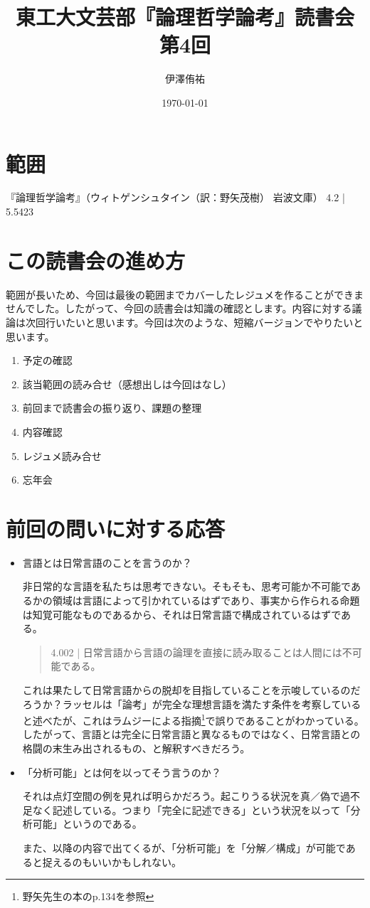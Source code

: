 \documentclass[a4paper,onecolumn,openany,article]{jsarticle}
\title{東工大文芸部『論理哲学論考』読書会 第4回}
\author{伊澤侑祐}
\date{\today}
\begin{document}
\maketitle

\section*{範囲}
『論理哲学論考』（ウィトゲンシュタイン（訳：野矢茂樹） 岩波文庫） 4.2 | 5.5423

\section{この読書会の進め方}
範囲が長いため、今回は最後の範囲までカバーしたレジュメを作ることができませんでした。したがって、今回の読書会は知識の確認とします。内容に対する議論は次回行いたいと思います。今回は次のような、短縮バージョンでやりたいと思います。
\begin{enumerate}
  \item 予定の確認
  \item 該当範囲の読み合せ（感想出しは今回はなし）
  \item 前回まで読書会の振り返り、課題の整理
  \item 内容確認
  \item レジュメ読み合せ
  \item 忘年会
\end{enumerate}

\section{前回の問いに対する応答}
\begin{itemize}
  \item 言語とは日常言語のことを言うのか？

  非日常的な言語を私たちは思考できない。そもそも、思考可能か不可能であるかの領域は言語によって引かれているはずであり、事実から作られる命題は知覚可能なものであるから、それは日常言語で構成されているはずである。
  \begin{quote}
     4.002 | 日常言語から言語の論理を直接に読み取ることは人間には不可能である。
  \end{quote}

  これは果たして日常言語からの脱却を目指していることを示唆しているのだろうか？ラッセルは「論考」が完全な理想言語を満たす条件を考察していると述べたが、これはラムジーによる指摘\footnote{野矢先生の本のp.134を参照}で誤りであることがわかっている。したがって、言語とは完全に日常言語と異なるものではなく、日常言語との格闘の末生み出されるもの、と解釈すべきだろう。

  \item 「分析可能」とは何を以ってそう言うのか？

  それは点灯空間の例を見れば明らかだろう。起こりうる状況を真／偽で過不足なく記述している。つまり「完全に記述できる」という状況を以って「分析可能」というのである。

  また、以降の内容で出てくるが、「分析可能」を「分解／構成」が可能であると捉えるのもいいかもしれない。

\end{itemize}
\end{document}
